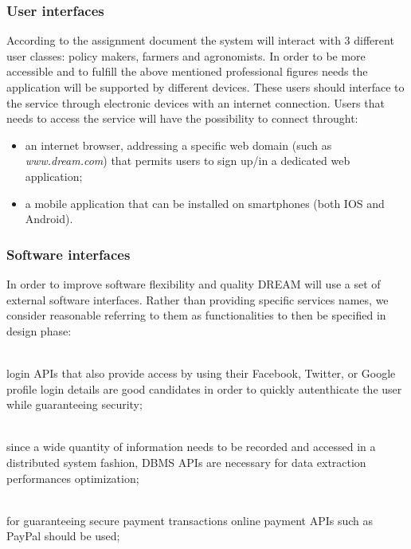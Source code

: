\subsubsection{User interfaces} %
\label{sect:user_interfaces}
According to the assignment document the system will interact with 3 different user classes: policy makers, farmers and agronomists. In order to be more accessible and to fulfill the above mentioned professional figures needs the application will be supported by different devices. These users should interface to the service through electronic devices with an internet connection. Users that needs to access the service will have the possibility to connect throught:
\begin{itemize}
    \item an internet browser, addressing a specific web domain (such as \textit{www.dream.com}) that permits users to sign up/in a dedicated web application;
    \item a mobile application that can be installed on smartphones (both IOS and Android).
\end{itemize}


\subsubsection{Software interfaces}
In order to improve software flexibility and quality DREAM will use a set of external software interfaces. Rather than providing specific services names, we consider reasonable referring to them as functionalities to then be specified in design phase:
\begin{description}[font=~\normalfont\scshape]
    \item[\textbf{\textcolor{myblue}{universal logins}}] \hfill \\login APIs that also provide access by using their Facebook, Twitter, or Google profile login details are good candidates in order to quickly autenthicate the user while guaranteeing security;
    \item[\textbf{\textcolor{myblue}{big data manipulation}}] \hfill \\since a wide quantity of information needs to be recorded and accessed in a distributed system fashion, DBMS APIs are necessary for data extraction performances optimization;
    \item[\textbf{\textcolor{myblue}{third party payment processing}}] \hfill \\for guaranteeing secure payment transactions online payment APIs such as PayPal should be used;
    \item[\textbf{\textcolor{myblue}{third party data science research}}] \hfill \\%
\end{description}

